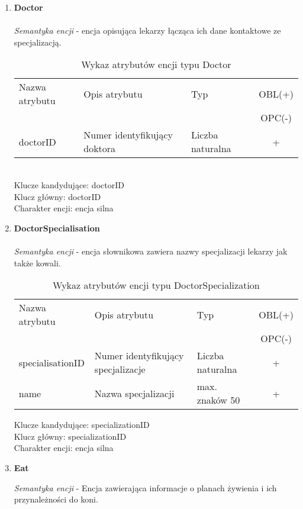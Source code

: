 \documentclass[12pt,twoside]{report}
\begin{document}
\begin{enumerate}[start=1,label={\bfseries ENC\textbackslash00\arabic*}]
	
	\item \textbf{Doctor}\\ \\
	\textit{Semantyka encji} - encja opisująca lekarzy łącząca ich dane kontaktowe ze specjalizacją.
	\begin{table}[h!]
		\centering
		\begin{tabular}{|l|l|l|c|}
			\hline
			Nazwa atrybutu & Opis atrybutu & Typ & OBL(+) \\
			& & &  OPC(-) \\
			\hline
			doctorID & Numer identyfikujący doktora & Liczba naturalna & + \\
			\hline
		\end{tabular}
		\caption{Wykaz atrybutów encji typu Doctor }
	\end{table}\\
	Klucze kandydujące: doctorID \\
	Klucz główny: doctorID \\
	Charakter encji: encja silna \\
	
	\item \textbf{DoctorSpecialisation}\\ \\
	\textit{Semantyka encji} - encja słownikowa zawiera nazwy specjalizacji lekarzy jak także kowali.\\
	\begin{table}[h!]
		\centering
		\begin{tabular}{|l|l|l|c|}
			\hline
			Nazwa atrybutu & Opis atrybutu & Typ & OBL(+) \\
			& & &  OPC(-) \\
			\hline
			specialisationID & Numer identyfikujący specjalizacje & Liczba naturalna & + \\
			\hline
			name & Nazwa specjalizacji & max. znaków 50 & + \\
			\hline
		\end{tabular}
		\caption{Wykaz atrybutów encji typu DoctorSpecialization }
	\end{table}
	Klucze kandydujące: specializationID \\
	Klucz główny: specializationID \\
	Charakter encji: encja silna \\
	
	\item \textbf{Eat}
	
		\textit{Semantyka encji} - Encja zawierająca informacje o planach żywienia i ich przynależności do koni.
	

\end{enumerate}
\end{document}
